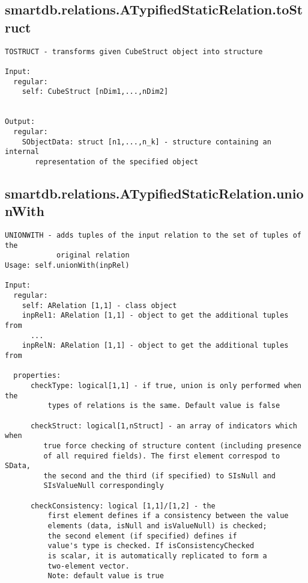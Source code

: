 \subsection{\texorpdfstring{smartdb.relations.ATypifiedStaticRelation.toStruct}{toStruct}}\label{method:smartdb.relations.ATypifiedStaticRelation.toStruct}
\begin{verbatim}
TOSTRUCT - transforms given CubeStruct object into structure

Input:
  regular:
    self: CubeStruct [nDim1,...,nDim2]


Output:
  regular:
    SObjectData: struct [n1,...,n_k] - structure containing an internal
       representation of the specified object
\end{verbatim}
\subsection{\texorpdfstring{smartdb.relations.ATypifiedStaticRelation.unionWith}{unionWith}}\label{method:smartdb.relations.ATypifiedStaticRelation.unionWith}
\begin{verbatim}
UNIONWITH - adds tuples of the input relation to the set of tuples of the
            original relation
Usage: self.unionWith(inpRel)

Input:
  regular:
    self: ARelation [1,1] - class object
    inpRel1: ARelation [1,1] - object to get the additional tuples from
      ...
    inpRelN: ARelation [1,1] - object to get the additional tuples from

  properties:
      checkType: logical[1,1] - if true, union is only performed when the
          types of relations is the same. Default value is false

      checkStruct: logical[1,nStruct] - an array of indicators which when
         true force checking of structure content (including presence
         of all required fields). The first element correspod to SData,
         the second and the third (if specified) to SIsNull and
         SIsValueNull correspondingly

      checkConsistency: logical [1,1]/[1,2] - the
          first element defines if a consistency between the value
          elements (data, isNull and isValueNull) is checked;
          the second element (if specified) defines if
          value's type is checked. If isConsistencyChecked
          is scalar, it is automatically replicated to form a
          two-element vector.
          Note: default value is true
\end{verbatim}
